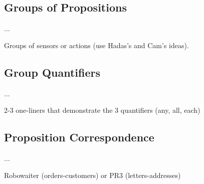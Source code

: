 \subsection{Groups of Propositions} 

...

\begin{myExample}\label{Ex:groups}
	Groups of sensors or actions (use Hadas's and Cam's ideas).
\end{myExample}

\subsection{Group Quantifiers} 

...

\begin{myExample}\label{Ex:quantifiers}
	2-3 one-liners that demonstrate the 3 quantifiers (any, all, each)
\end{myExample}

\subsection{Proposition Correspondence} 

...

\begin{myExample}\label{Ex:corresponding}
	Robowaiter (orders-customers) or PR3 (letters-addresses)
\end{myExample}